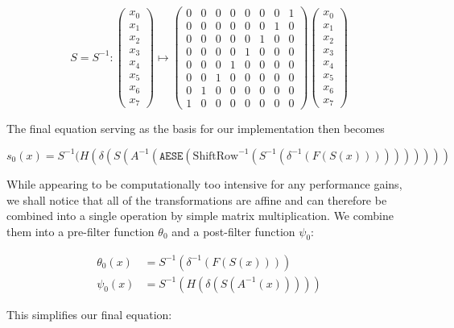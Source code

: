 \[
    S=S^{-1}:\begin{pmatrix}x_0\\x_1\\x_2\\x_3\\x_4\\x_5\\x_6\\x_7\end{pmatrix}\mapsto
    \begin{pmatrix}
        0 & 0 & 0 & 0 & 0 & 0 & 0 & 1 \\
        0 & 0 & 0 & 0 & 0 & 0 & 1 & 0 \\
        0 & 0 & 0 & 0 & 0 & 1 & 0 & 0 \\
        0 & 0 & 0 & 0 & 1 & 0 & 0 & 0 \\
        0 & 0 & 0 & 1 & 0 & 0 & 0 & 0 \\
        0 & 0 & 1 & 0 & 0 & 0 & 0 & 0 \\
        0 & 1 & 0 & 0 & 0 & 0 & 0 & 0 \\
        1 & 0 & 0 & 0 & 0 & 0 & 0 & 0
    \end{pmatrix}
    \begin{pmatrix}x_0\\x_1\\x_2\\x_3\\x_4\\x_5\\x_6\\x_7\end{pmatrix}
\]

The final equation serving as the basis for our implementation then becomes

\[
    s_0(x)=S^{-1}(H(\delta(S(A^{-1}(\texttt{AESE}(\text{ShiftRow}^{-1}(S^{-1}(\delta^{-1}(F(S(x))))))))))
\]

While appearing to be computationally too intensive for any performance gains,
we shall notice that all of the transformations are affine and can therefore be
combined into a single operation by simple matrix multiplication. We combine
them into a pre-filter function $\theta_0$ and a post-filter function $\psi_0$:

\begin{align*}
    \theta_0(x)&=S^{-1}(\delta^{-1}(F(S(x)))) \\
    \psi_0(x)&=S^{-1}(H(\delta(S(A^{-1}(x)))))
\end{align*}

This simplifies our final equation:

